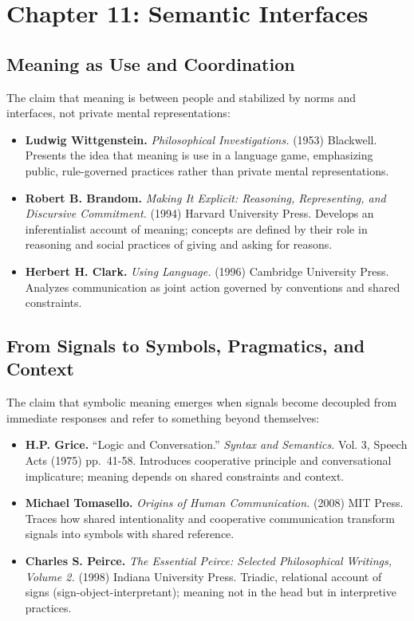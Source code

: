 \documentclass[
  openright]{book}
\begin{document}
\section{Chapter 11: Semantic
Interfaces}\label{chapter-11-semantic-interfaces}

\subsection{Meaning as Use and
Coordination}\label{meaning-as-use-and-coordination}

The claim that meaning is between people and stabilized by norms and
interfaces, not private mental representations:

\begin{itemize}
\item
  \textbf{Ludwig Wittgenstein.} \emph{Philosophical Investigations.}
  (1953) Blackwell. Presents the idea that meaning is use in a language
  game, emphasizing public, rule-governed practices rather than private
  mental representations.
\item
  \textbf{Robert B. Brandom.} \emph{Making It Explicit: Reasoning,
  Representing, and Discursive Commitment.} (1994) Harvard University
  Press. Develops an inferentialist account of meaning; concepts are
  defined by their role in reasoning and social practices of giving and
  asking for reasons.
\item
  \textbf{Herbert H. Clark.} \emph{Using Language.} (1996) Cambridge
  University Press. Analyzes communication as joint action governed by
  conventions and shared constraints.
\end{itemize}

\subsection{From Signals to Symbols, Pragmatics, and
Context}\label{from-signals-to-symbols-pragmatics-and-context}

The claim that symbolic meaning emerges when signals become decoupled
from immediate responses and refer to something beyond themselves:

\begin{itemize}
\item
  \textbf{H.P. Grice.} ``Logic and Conversation.'' \emph{Syntax and
  Semantics.} Vol. 3, Speech Acts (1975) pp.~41-58. Introduces
  cooperative principle and conversational implicature; meaning depends
  on shared constraints and context.
\item
  \textbf{Michael Tomasello.} \emph{Origins of Human Communication.}
  (2008) MIT Press. Traces how shared intentionality and cooperative
  communication transform signals into symbols with shared reference.
\item
  \textbf{Charles S. Peirce.} \emph{The Essential Peirce: Selected
  Philosophical Writings, Volume 2.} (1998) Indiana University Press.
  Triadic, relational account of signs (sign-object-interpretant);
  meaning not in the head but in interpretive practices.
\end{itemize}
\end{document}
